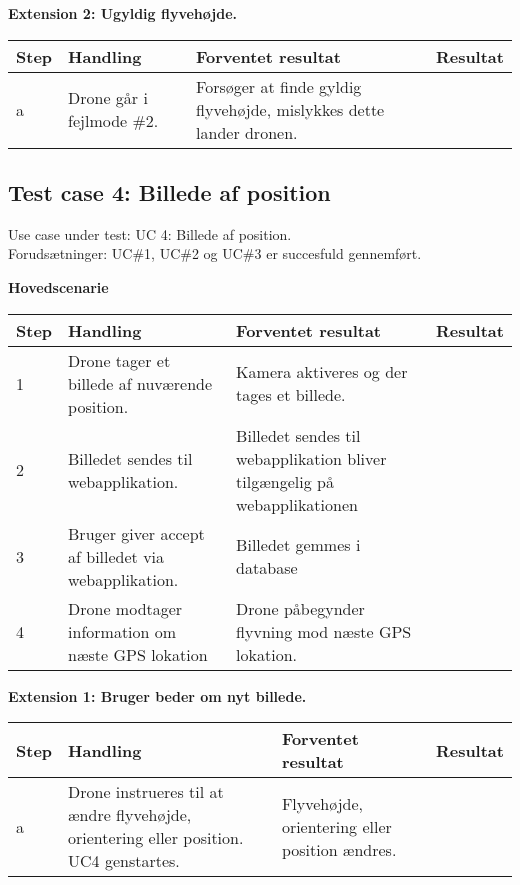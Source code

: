 \textbf{Extension 2: Ugyldig flyvehøjde.}
\begin{table}[H]
	\centering
		\begin{tabular}{|l|p{5 cm}|p{5 cm}|p{3.5 cm}|} 
		\hline
			Step & Handling & Forventet resultat & Resultat\\ \hline
			a & Drone går i fejlmode \#2. & Forsøger at finde gyldig flyvehøjde, mislykkes dette lander dronen. & \\ \hline
		\end{tabular}
\end{table}

\newpage

\subsection*{Test case 4: Billede af position}
Use case under test: UC 4: Billede af position.\\
Forudsætninger:	UC\#1, UC\#2 og UC\#3 er succesfuld gennemført.

\textbf{Hovedscenarie}
\begin{table}[H]
	\centering
		\begin{tabular}{|l|p{5 cm}|p{5 cm}|p{3.5 cm}|} 
		\hline
			Step & Handling & Forventet resultat & Resultat\\ \hline
			1 & Drone tager et billede af nuværende position. & Kamera aktiveres og der tages et billede. & \\ \hline
			2 & Billedet sendes til webapplikation. & Billedet sendes til webapplikation bliver tilgængelig på webapplikationen &  \\ \hline
			3 & Bruger giver accept af billedet via webapplikation. & Billedet gemmes i database  & \\ \hline
			4 & Drone modtager information om næste GPS lokation & Drone påbegynder flyvning mod næste GPS lokation. & \\ \hline

		\end{tabular}
\end{table}


\textbf{Extension 1: Bruger beder om nyt billede.}
\begin{table}[H]
	\centering
		\begin{tabular}{|l|p{5 cm}|p{5 cm}|p{3.5 cm}|} 
		\hline
			Step & Handling & Forventet resultat & Resultat\\ \hline
			a & Drone instrueres til at ændre flyvehøjde, orientering eller position. UC4 genstartes. & Flyvehøjde, orientering eller position ændres. & \\ \hline
		\end{tabular}
\end{table}

